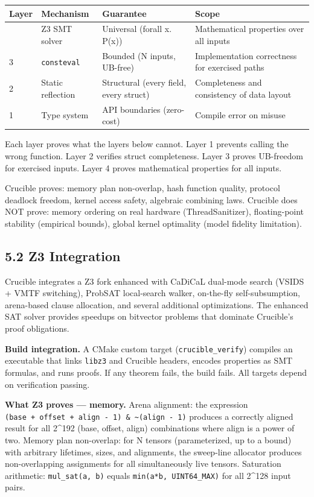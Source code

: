 \begin{longtable}[]{@{}llll@{}}
\toprule\noalign{}
Layer & Mechanism & Guarantee & Scope \\
\midrule\noalign{}
\endhead
\bottomrule\noalign{}
\endlastfoot
4 & Z3 SMT solver & Universal (forall x. P(x)) & Mathematical properties over all inputs \\
3 & \texttt{consteval} & Bounded (N inputs, UB-free) & Implementation correctness for exercised paths \\
2 & Static reflection & Structural (every field, every struct) & Completeness and consistency of data layout \\
1 & Type system & API boundaries (zero-cost) & Compile error on misuse \\
\end{longtable}

Each layer proves what the layers below cannot. Layer 1 prevents calling the wrong function. Layer 2 verifies struct completeness. Layer 3 proves UB-freedom for exercised inputs. Layer 4 proves mathematical properties for all inputs.

Crucible proves: memory plan non-overlap, hash function quality, protocol deadlock freedom, kernel access safety, algebraic combining laws. Crucible does NOT prove: memory ordering on real hardware (ThreadSanitizer), floating-point stability (empirical bounds), global kernel optimality (model fidelity limitation).

\subsection{5.2 Z3 Integration}\label{z3-integration}

Crucible integrates a Z3 fork enhanced with CaDiCaL dual-mode search (VSIDS + VMTF switching), ProbSAT local-search walker, on-the-fly self-subsumption, arena-based clause allocation, and several additional optimizations. The enhanced SAT solver provides speedups on bitvector problems that dominate Crucible's proof obligations.

\textbf{Build integration.} A CMake custom target (\texttt{crucible\_verify}) compiles an executable that links \texttt{libz3} and Crucible headers, encodes properties as SMT formulas, and runs proofs. If any theorem fails, the build fails. All targets depend on verification passing.

\textbf{What Z3 proves --- memory.} Arena alignment: the expression \texttt{(base\ +\ offset\ +\ align\ -\ 1)\ \&\ \textasciitilde{}(align\ -\ 1)} produces a correctly aligned result for all 2\^{}192 (base, offset, align) combinations where align is a power of two. Memory plan non-overlap: for N tensors (parameterized, up to a bound) with arbitrary lifetimes, sizes, and alignments, the sweep-line allocator produces non-overlapping assignments for all simultaneously live tensors. Saturation arithmetic: \texttt{mul\_sat(a,\ b)} equals \texttt{min(a*b,\ UINT64\_MAX)} for all 2\^{}128 input pairs.

